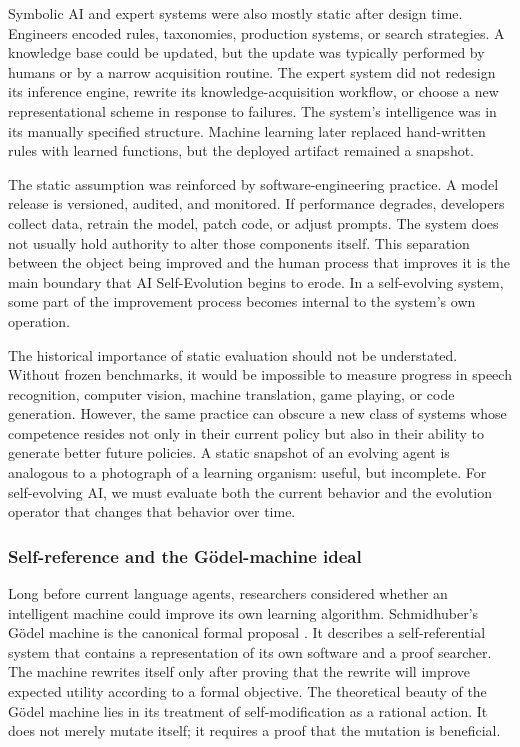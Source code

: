 Symbolic AI and expert systems were also mostly static after design time. Engineers encoded rules, taxonomies, production systems, or search strategies. A knowledge base could be updated, but the update was typically performed by humans or by a narrow acquisition routine. The expert system did not redesign its inference engine, rewrite its knowledge-acquisition workflow, or choose a new representational scheme in response to failures. The system's intelligence was in its manually specified structure. Machine learning later replaced hand-written rules with learned functions, but the deployed artifact remained a snapshot.

The static assumption was reinforced by software-engineering practice. A model release is versioned, audited, and monitored. If performance degrades, developers collect data, retrain the model, patch code, or adjust prompts. The system does not usually hold authority to alter those components itself. This separation between the object being improved and the human process that improves it is the main boundary that AI Self-Evolution begins to erode. In a self-evolving system, some part of the improvement process becomes internal to the system's own operation.

The historical importance of static evaluation should not be understated. Without frozen benchmarks, it would be impossible to measure progress in speech recognition, computer vision, machine translation, game playing, or code generation. However, the same practice can obscure a new class of systems whose competence resides not only in their current policy but also in their ability to generate better future policies. A static snapshot of an evolving agent is analogous to a photograph of a learning organism: useful, but incomplete. For self-evolving AI, we must evaluate both the current behavior and the evolution operator that changes that behavior over time.

\subsubsection{Self-reference and the G{\"o}del-machine ideal}

Long before current language agents, researchers considered whether an intelligent machine could improve its own learning algorithm. Schmidhuber's G{\"o}del machine is the canonical formal proposal \cite{schmidhuber2003}. It describes a self-referential system that contains a representation of its own software and a proof searcher. The machine rewrites itself only after proving that the rewrite will improve expected utility according to a formal objective. The theoretical beauty of the G{\"o}del machine lies in its treatment of self-modification as a rational action. It does not merely mutate itself; it requires a proof that the mutation is beneficial.

